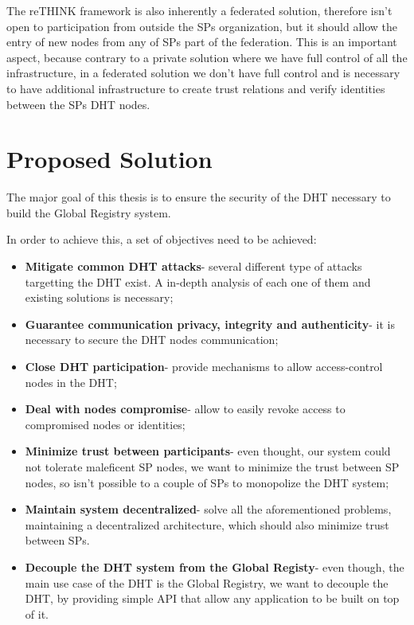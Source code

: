 The reTHINK framework is also inherently a federated solution, therefore isn't open to participation from outside the \acp{SP} organization, but it should allow the entry of new nodes from any of \acp{SP} part of the federation.
This is an important aspect, because contrary to a private solution where we have full control of all the infrastructure, in a federated solution we don't have full control and is necessary to have additional infrastructure to create trust relations and verify identities between the \acp{SP} \ac{DHT} nodes.

\section{Proposed Solution}
\label{section:proposed}

The major goal of this thesis is to ensure the security of the \ac{DHT} necessary to build the Global Registry system.

In order to achieve this, a set of objectives need to be achieved:

\begin{itemize}
  \item \textbf{Mitigate common \ac{DHT} attacks}- several different type of attacks targetting the \ac{DHT} exist. A in-depth analysis of each one of them and existing solutions is necessary;
	\item \textbf{Guarantee communication privacy, integrity and authenticity}- it is necessary to secure the \ac{DHT} nodes communication;
	\item \textbf{Close DHT participation}- provide mechanisms to allow access-control nodes in the \ac{DHT};
	\item \textbf{Deal with nodes compromise}- allow to easily revoke access to compromised nodes or identities;
	\item \textbf{Minimize trust between participants}- even thought, our system could not tolerate maleficent \ac{SP} nodes, we want to minimize the trust between \ac{SP} nodes, so isn't possible to a couple of \acp{SP} to monopolize the DHT system;
  \item \textbf{Maintain system decentralized}- solve all the aforementioned problems, maintaining a decentralized architecture, which should also minimize trust between \acp{SP}.
	\item \textbf{Decouple the DHT system from the Global Registy}- even though, the main use case of the DHT is the Global Registry, we want to decouple the DHT, by providing simple API that allow any application to be built on top of it.
\end{itemize}

